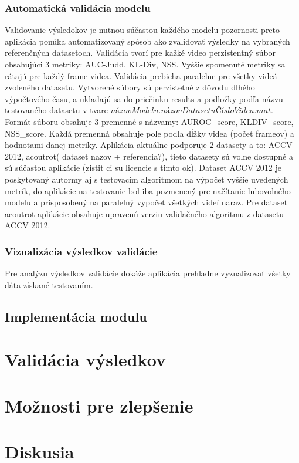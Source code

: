 \subsubsection{Automatická validácia modelu}
Validovanie výsledokov je nutnou súčastou každého modelu pozornosti preto aplikácia ponúka automatizovaný spôsob ako zvalidovať výsledky na vybraných referenčných datasetoch.
Validácia tvorí pre kažké video perzistentný súbor obsahujúci 3 metriky: AUC-Judd, KL-Div, NSS.
Vyššie spomenuté metriky sa rátajú pre každý frame videa.
Validácia prebieha paralelne pre všetky videá zvoleného datasetu.
Vytvorené súbory sú perzistetné z dôvodu dlhého výpočtového času, a ukladajú sa do priečinku results a podložky podľa názvu testovaného datasetu v tvare \begin{math}názovModelu.názovDatasetuČísloVidea.mat\end{math}.
Formát súboru obsahuje 3 premenné s názvamy: AUROC\_score, KLDIV\_score, NSS\_score.
Každá premenná obsahuje pole podla dĺžky videa (počet frameov) a hodnotami danej metriky.
Aplikácia aktuálne podporuje 2 datasety a to: ACCV 2012\cite{accv}, acoutrot( dataset nazov + referencia?), tieto datasety sú volne dostupné a sú súčastou aplikácie (zistit ci su licencie s timto ok).
Dataset ACCV 2012\cite{accv} je poskytovaný autormy aj s testovacím algoritmom na výpočet vyššie uvedených metrík, do aplikácie na testovanie bol iba pozmenený pre načítanie ľubovolného modelu a prisposobený na paralelný vypočet všetkých videí naraz.
Pre dataset acoutrot aplikácie obsahuje upravenú verziu validačného algoritmu z datasetu ACCV 2012.

\subsubsection{Vizualizácia výsledkov validácie}
Pre analýzu výsledkov validácie dokáže aplikácia prehladne vyzualizovať všetky dáta získané testovaním.

\subsection{Implementácia modulu}

\section{Validácia výsledkov}
\section{Možnosti pre zlepšenie}
\section{Diskusia}
